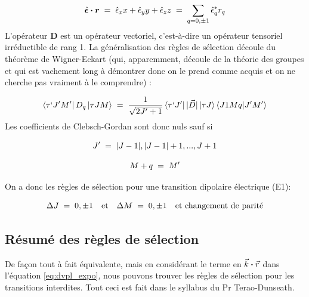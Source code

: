\begin{equation}
    \hat{\bm{\epsilon}}\boldsymbol{\cdot} \bm{r} \; = \; \hat{\epsilon}_xx + \hat{\epsilon}_yy + \hat{\epsilon}_zz \; = \; \sum_{q=0,\pm 1}  \hat{\epsilon}_q^* r_q
\end{equation}
L'opérateur $\bm{D}$ est un opérateur vectoriel, c'est-à-dire un opérateur tensoriel irréductible de rang 1. La généralisation des règles de sélection découle du théorème de Wigner-Eckart (qui, apparemment, découle de la théorie des groupes et qui est vachement long à démontrer donc on le prend comme acquis et on ne cherche pas vraiment à le comprendre) :

\begin{equation}
    \bra{\tau ` J'M'}D_q\ket{\tau JM}\; = \; \dfrac{1}{\sqrt{2J'+1}}\bra{\tau `J'}|\vec{D}|\ket{\tau J}\bra{J1Mq}\ket{J'M'}
\end{equation}
Les coefficients de Clebsch-Gordan sont donc nuls sauf si

\[
    J'\; = \; |J-1|, |J-1|+1, ..., J+1
\]

\[
    M+q\; = \; M'
\]

On a donc les règles de sélection pour une transition dipolaire électrique (E1):

\begin{equation}
    \Delta J\; = \; 0, \pm1 \quad \text{et} \quad \Delta M\; = \; 0, \pm 1 \quad \text{et        changement de parité}
\end{equation}


\newpage %
\subsection{Résumé des règles de sélection}

De façon tout à fait équivalente, mais en considérant le terme en $\vec{k}\boldsymbol{\cdot}\vec{r}$ dans l'équation \eqref{eq:dvpl_expo}, nous pouvons trouver les règles de sélection pour les transitions interdites. Tout ceci est fait dans le syllabus du Pr Terao-Dunseath.


